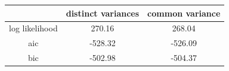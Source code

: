 \begin{tabular}{ccc}
\hline
 & distinct variances & common variance \\
\hline
log likelihood & 270.16 & 268.04 \\
aic & -528.32 & -526.09 \\
bic & -502.98 & -504.37 \\
\hline
\end{tabular}
